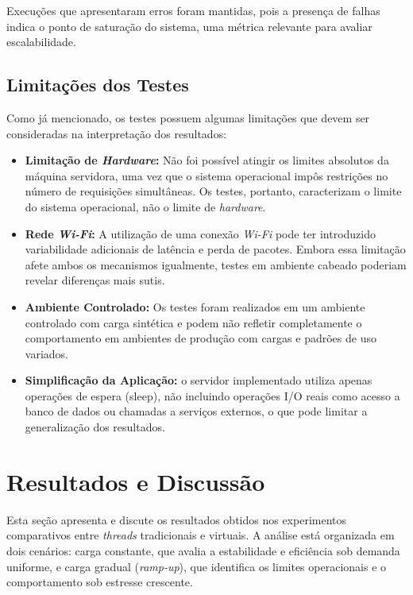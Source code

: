 \documentclass[12pt, openright, oneside, a4paper, english,	french,	spanish, brazil	]{abntex2}
\begin{document}
    Execuções que apresentaram erros foram mantidas, pois a presença de falhas indica o ponto de saturação do sistema, uma métrica relevante para avaliar escalabilidade.

    \section{Limitações dos Testes}

    Como já mencionado, os testes possuem algumas limitações que devem ser consideradas na interpretação dos resultados:
    \begin{itemize}
        \item \textbf{Limitação de \textit{Hardware}:} Não foi possível atingir os limites absolutos da máquina servidora, uma vez que o sistema operacional impôs restrições no número de requisições simultâneas. Os testes, portanto, caracterizam o limite do sistema operacional, não o limite de \textit{hardware}.
        \item \textbf{Rede \textit{Wi-Fi}:} A utilização de uma conexão \textit{Wi-Fi} pode ter introduzido variabilidade adicionais de latência e perda de pacotes. Embora essa limitação afete ambos os mecanismos igualmente, testes em ambiente cabeado poderiam revelar diferenças mais sutis.
        \item \textbf{Ambiente Controlado:} Os testes foram realizados em um ambiente controlado com carga sintética e podem não refletir completamente o comportamento em ambientes de produção com cargas e padrões de uso variados.

        \item \textbf{Simplificação da Aplicação:} o servidor implementado utiliza apenas operações de espera (sleep), não incluindo operações I/O reais como acesso a banco de dados ou chamadas a serviços externos, o que pode limitar a generalização dos resultados.
    \end{itemize}

\chapter{Resultados e Discussão}
\label{chapter:resultados}

Esta seção apresenta e discute os resultados obtidos nos experimentos comparativos entre \textit{threads} tradicionais e virtuais. A análise está organizada em dois cenários: carga constante, que avalia a estabilidade e eficiência sob demanda uniforme, e carga gradual (\textit{ramp-up}), que identifica os limites operacionais e o comportamento sob estresse crescente. 
\end{document}
